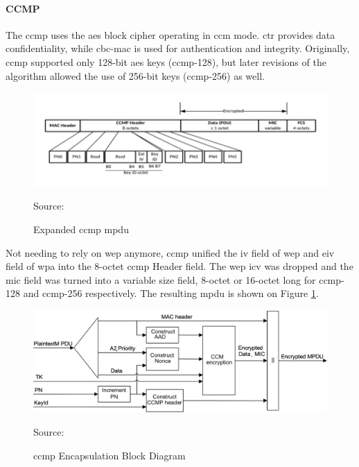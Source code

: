 \paragraph{CCMP}

The \gls{ccmp} uses the \gls{aes} block cipher operating in \gls{ccm} mode. \gls{ctr} provides data confidentiality, while \gls{cbc}-\gls{mac} is used for authentication and integrity. Originally, \gls{ccmp} supported only 128-bit \gls{aes} keys (\gls{ccmp}-128), but later revisions of the algorithm allowed the use of 256-bit keys (\gls{ccmp}-256) as well.

\begin{figure}[h]
    \centering
    \includegraphics[width=\linewidth]{contents/background-in-wireless-networks/protected-network-standards/wpa2/ccmp/expanded-ccmp-mpdu.png}
    \caption{Expanded \gls{ccmp} \gls{mpdu}}
    {Source: \cite{ieee_80211_2020}}
    \label{figure:ieee80211_figure43n}
\end{figure}

Not needing to rely on \gls{wep} anymore, \gls{ccmp} unified the \gls{iv} field of \gls{wep} and \gls{eiv} field of \gls{wpa} into the 8-octet \gls{ccmp} Header field. The \gls{wep} \gls{icv} was dropped and the \gls{mic} field was turned into a variable size field, 8-octet or 16-octet long for \gls{ccmp}-128 and \gls{ccmp}-256 respectively. The resulting \gls{mpdu} is shown on Figure \ref{figure:ieee80211_figure43n}.

\begin{figure}[h]
    \centering
    \includegraphics[width=\linewidth]{contents/background-in-wireless-networks/protected-network-standards/wpa2/ccmp/ccmp-encapsulation-block-diagram.png}
    \caption{\gls{ccmp} Encapsulation Block Diagram}
    {Source: \cite{ieee_80211_2020}}
    \label{figure:ieee80211_figure43o}
\end{figure}

